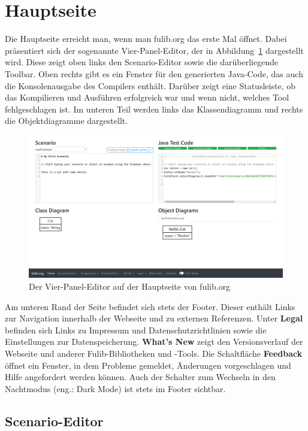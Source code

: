 \section{Hauptseite}\label{sec:main-page}

Die Hauptseite erreicht man, wenn man fulib.org das erste Mal öffnet.
Dabei präsentiert sich der sogenannte Vier-Panel-Editor, der in Abbildung~\ref{fig:four-pane-editor} dargestellt wird.
Diese zeigt oben links den Scenario-Editor sowie die darüberliegende Toolbar.
Oben rechts gibt es ein Fenster für den generierten Java-Code, das auch die Konsolenausgabe des Compilers enthält.
Darüber zeigt eine Statusleiste, ob das Kompilieren und Ausführen erfolgreich war und wenn nicht, welches Tool fehlgeschlagen ist.
Im unteren Teil werden links das Klassendiagramm und rechts die Objektdiagramme dargestellt.

\begin{figure}
    \includegraphics[width=\textwidth]{chapter/fulib.org/img/four-pane-editor.png}
    \caption{Der Vier-Panel-Editor auf der Hauptseite von fulib.org}
    \label{fig:four-pane-editor}
\end{figure}

Am unteren Rand der Seite befindet sich stets der Footer.
Dieser enthält Links zur Navigation innerhalb der Webseite und zu externen Referenzen.
Unter \textbf{Legal} befinden sich Links zu Impressum und Datenschutzrichtlinien sowie die Einstellungen zur Datenspeicherung.
\textbf{What's New} zeigt den Versionsverlauf der Webseite und anderer Fulib-Bibliotheken und -Tools.
Die Schaltfläche \textbf{Feedback} öffnet ein Fenster, in dem Probleme gemeldet, Änderungen vorgeschlagen und Hilfe angefordert werden können.
Auch der Schalter zum Wechseln in den Nachtmodus (eng.: Dark Mode) ist stets im Footer sichtbar.

\subsection{Scenario-Editor}\label{subsec:scenario-editor}


